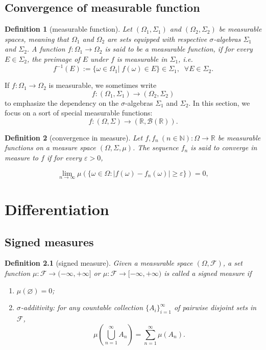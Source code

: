 \documentclass{report}
\newtheorem{definition}{Definition}[section]
\theoremstyle{nonumberplain}
\begin{document}
\section{Convergence of measurable function}
\begin{definition}[measurable function]
	Let $(\Omega_1,\Sigma_1 )$ and $(\Omega_2,\Sigma_2)$ be measurable spaces, meaning that $\Omega_1$ and $\Omega_2$ are sets equipped with respective $\sigma$-algebras $\Sigma_1$ and $\Sigma_2$. A function $f:\Omega_1\to \Omega_2$ is said to be a \emph{measurable function}, if for every $E\in \Sigma_2$, the preimage of $E$ under $f$ is measurable in $\Sigma_1$, i.e.
	\[
	f^{-1}(E):=\{\omega\in \Omega_1|\;f(\omega)\in E\}\in \Sigma_1 ,\;\;\forall E\in\Sigma_2.
	\]
\end{definition}
If $f:\Omega_1\to \Omega_2$ is measurable, we sometimes write
$$f\colon (\Omega_1,\Sigma_1 )\rightarrow (\Omega_2,\Sigma_2 )$$
to emphasize the dependency on the $\sigma$-algebras $\Sigma_1$ and $\Sigma_2$.
In this section, we focus on a sort of special measurable functions:
\[
f\colon (\Omega,\Sigma )\rightarrow (\mathbb{R},\mathcal{B}(\mathbb{R}) ).
\]   
\begin{definition}[convergence in measure]
	Let $f,f_{n}\ (n\in {\mathbb  N}):\Omega\to {\mathbb  R}$ be measurable functions on a measure space $(\Omega,\Sigma ,\mu )$. The sequence $ f_{n}$ is said to converge in measure to $f$ if for every $\varepsilon >0$,
	
	$$\lim_{{n\to \infty }}\mu \left(\{\omega\in \Omega:|f(\omega)-f_{n}(\omega)|\geq \varepsilon \}\right)=0,$$
\end{definition}

\chapter{Differentiation}

\section{Signed measures}

\begin{definition}[signed measure]
	Given a measurable space $(\Omega, \mathcal{F})$, a set function $\mu:\mathcal{F}\to(-\infty,+\infty]$ or $\mu:\mathcal{F}\to[-\infty,+\infty)$ is called a \emph{signed measure} if
	\begin{enumerate}
		\item[(a)]$\mu(\varnothing) = 0$;
		\item[(b)]$\sigma$-additivity: for any countable collection $\{A_{i}\}_{i=1}^{\infty }$ of pairwise disjoint sets in $\mathcal{F}$,
		\[
		\mu\left(\bigcup_{n=1}^\infty A_n\right)=\sum_{n=1}^{\infty}\mu(A_n).
		\]
	\end{enumerate}
\end{definition}
\end{document}

